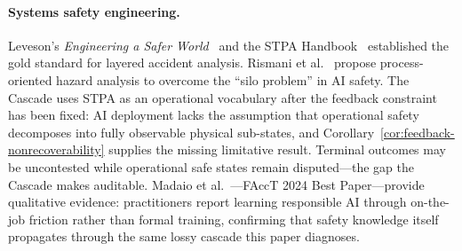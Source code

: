 \paragraph{Systems safety engineering.} Leveson's \textit{Engineering a Safer World}~\cite{leveson2012engineering} and the STPA Handbook~\cite{leveson2018stpa} established the gold standard for layered accident analysis. Rismani et al.~\cite{rismani2024silos} propose process-oriented hazard analysis to overcome the ``silo problem'' in AI safety. The Cascade uses STPA as an operational vocabulary after the feedback constraint has been fixed: AI deployment lacks the assumption that operational safety decomposes into fully observable physical sub-states, and Corollary~\ref{cor:feedback-nonrecoverability} supplies the missing limitative result. Terminal outcomes may be uncontested while operational safe states remain disputed---the gap the Cascade makes auditable. Madaio et al.~\cite{madaio2024rai}---FAccT 2024 Best Paper---provide qualitative evidence: practitioners report learning responsible AI through on-the-job friction rather than formal training, confirming that safety knowledge itself propagates through the same lossy cascade this paper diagnoses.

